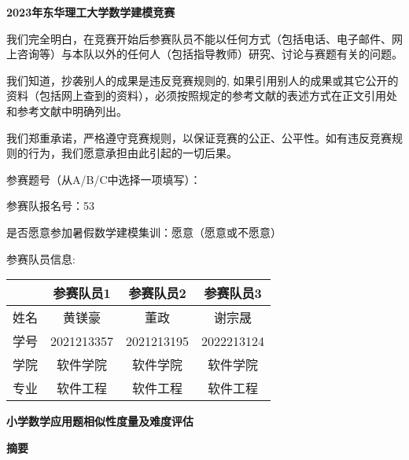 \thispagestyle{empty}   %

\begin{center}
    \textbf{\fontsize{30}{1.5} 2023年东华理工大学数学建模竞赛}
\end{center}

我们完全明白，在竞赛开始后参赛队员不能以任何方式（包括电话、电子邮件、网上咨询等）与本队以外的任何人（包括指导教师）研究、讨论与赛题有关的问题。

我们知道，抄袭别人的成果是违反竞赛规则的, 如果引用别人的成果或其它公开的资料（包括网上查到的资料），必须按照规定的参考文献的表述方式在正文引用处和参考文献中明确列出。

我们郑重承诺，严格遵守竞赛规则，以保证竞赛的公正、公平性。如有违反竞赛规则的行为，我们愿意承担由此引起的一切后果。

参赛题号（从A/B/C中选择一项填写）：

参赛队报名号：53

是否愿意参加暑假数学建模集训：愿意（愿意或不愿意）\newline


{\fontsize{20}{2}参赛队员信息:}

\begin{table}[h]
    \centering
    \begin{tabular}{|c|c|c|c|}
    \hline
       & 参赛队员1      & 参赛队员2      & 参赛队员3      \\ \hline
    姓名 & 黄镁豪        & 董政         & 谢宗晟        \\ \hline
    学号 & 2021213357 & 2021213195 & 2022213124 \\ \hline
    学院 & 软件学院       & 软件学院       & 软件学院       \\ \hline
    专业 & 软件工程       & 软件工程       & 软件工程       \\ \hline
    \end{tabular}
\end{table}


\newpage

\begin{center}
    \textbf{\fontsize{20}{1.5}小学数学应用题相似性度量及难度评估}

    \textbf{摘要}
\end{center}




\newpage
\tableofcontents
\thispagestyle{empty}